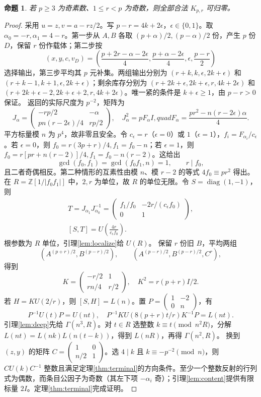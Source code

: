 \documentclass[11pt,a4paper]{article}
\newcommand{\Z}{\mathbb Z}
\newcommand{\diag}{\operatorname{diag}}
\newtheorem{proposition}[theorem]{命题}
\theoremstyle{definition}
\numberwithin{equation}{section}
\begin{document}
\begin{proposition}\label{prop:odd}
若 $p\ge3$ 为奇素数、$1\le r<p$ 为奇数，则全部合法 $K_{p,r}$ 可归零。
\end{proposition}
\begin{proof}
采用 $u=z,v=a-rz/2$。写 $p-r=4k+2\epsilon$，$\epsilon\in\{0,1\}$。取 $\alpha_0=-r,\alpha_1=4-r$。第一步从 $A,B$ 各取 $(p+\alpha)/2,(p-\alpha)/2$ 份，产生 $p$ 份 $D$，保留 $r$ 份作载体；第二步按
\[
(x,y,c,v_D)=\left(\frac{p+2r-\alpha-2\epsilon}{4},\frac{p+\alpha-2\epsilon}{4},\epsilon,\frac{p-r}{2}\right)
\]
选择输出，第三步平均其 $p$ 元补集。两组输出分别为 $(r+k,k,\epsilon,2k+\epsilon)$ 和 $(r+k-1,k+1,\epsilon,2k+\epsilon)$；剩余库存分别为 $(r+2k+\epsilon,2k+\epsilon,r,4k+2\epsilon)$ 和 $(r+2k+\epsilon-2,2k+\epsilon+2,r,4k+2\epsilon)$。唯一紧的条件是 $k+\epsilon\ge1$，由 $p-r>0$ 保证。
返回的实际尺度为 $p^{-2}$，矩阵为
\[
J_\alpha=\begin{pmatrix}-rp/2&-\alpha\\pn(r-2\epsilon)/4&rp/2\end{pmatrix},
\quad J_\alpha^2=pF_\alpha I,quad F_\alpha=\frac{pr^2-n(r-2\epsilon)\alpha}{4}.
\]
平方标量模 $n$ 为 $p^4$，故非零且安全。令 $c_\epsilon=r$（$\epsilon=0$）或 $1$（$\epsilon=1$），$f_i=F_{\alpha_i}/c_\epsilon$。若 $\epsilon=0$，则 $f_0=r(3p+r)/4,f_1=f_0-n$；若 $\epsilon=1$，则 $f_0=r[pr+n(r-2)]/4,f_1=f_0-n(r-2)$。这给出
\[
\gcd(f_0,f_1)=\gcd(f_0f_1,n)=1,\qquad r\mid f_0,
\]
且二者奇偶相反。第二种情形的互素性由模 $n$、模 $r-2$ 的等式 $4f_0\equiv pr^2$ 得出。
在 $R=\Z[1/|f_0f_1|]$ 中，$2,r$ 为单位，故 $R$ 的单位无限。令 $S=\diag(1,-1)$，则
\begin{gather*}
T=J_{\alpha_1}J_{\alpha_0}^{-1}
=\begin{pmatrix}f_1/f_0&-2r/(c_\epsilon f_0)\\0&1\end{pmatrix},\\
[S,T]=U\left(\frac{4r}{c_\epsilon f_0}\right).
\end{gather*}
根参数为 $R$ 单位，引理\ref{lem:localize}给 $U(R)$。
保留 $r$ 份旧 $B$，平均两组
\[
(A^{(p+r)/2},B^{(p-r)/2}),\qquad
(A^{(p-r)/2},B^{(p-r)/2},C^r),
\]
得到
\[
K=\begin{pmatrix}-r/2&1\\rn/4&r/2\end{pmatrix},\quad K^2=r(p+r)I/2.
\]
若 $H=KU(2/r)$，则 $[S,H]=L(n)$。置 $P=\left(\begin{smallmatrix}1&-2\\0&n\end{smallmatrix}\right)$，有
\[
P^{-1}U(t)P=U(nt),\quad
P^{-1}KU(8(p+r)t/r)K^{-1}P=L(nt).
\]
引理\ref{lem:deep}先给 $\Gamma(n^3,R)$。对 $t\in R$ 选整数 $k\equiv t\pmod{n^2R}$，分解 $L(nt)=L(nk)L(n(t-k))$，得到 $L(nR)$，再得 $\Gamma(n^2,R)$。
换到 $(z,y)$ 的矩阵 $C=\left(\begin{smallmatrix}1&0\\n/2&1\end{smallmatrix}\right)$。选 $4\mid k$ 且 $k\equiv-p^{-2}\pmod n$，则 $CU(k)C^{-1}$ 整数且满足定理\ref{thm:terminal}的方向条件。至少一个整数反射的行列式为偶数，而条目公因子为奇数（其左下项 $-\alpha_i$ 奇）；引理\ref{lem:content}提供有限标量 $2I$。定理\ref{thm:terminal}完成证明。
\end{proof}
\end{document}
